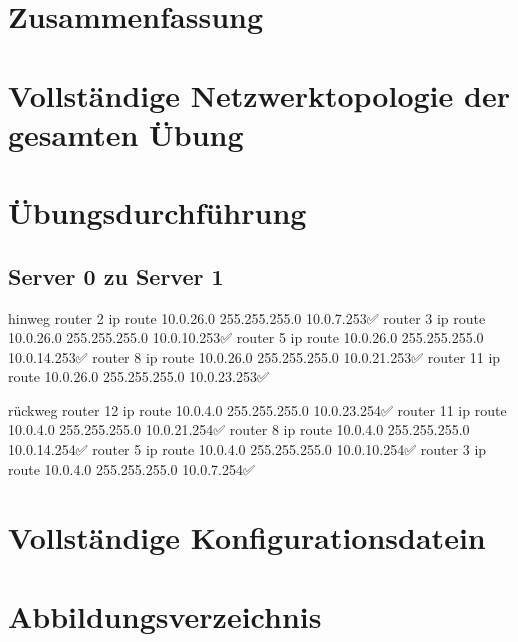 \documentclass[a4paper]{article}
\begin{document}
\section{Zusammenfassung}

\newpage

\section{Vollständige Netzwerktopologie der gesamten Übung}

\newpage

\section{Übungsdurchführung}

\subsection{Server 0 zu Server 1}

hinweg
router 2
ip route 10.0.26.0 255.255.255.0 10.0.7.253✅ 
router 3
ip route 10.0.26.0 255.255.255.0 10.0.10.253✅ 
router 5
ip route 10.0.26.0 255.255.255.0 10.0.14.253✅ 
router 8
ip route 10.0.26.0 255.255.255.0 10.0.21.253✅ 
router 11
ip route 10.0.26.0 255.255.255.0 10.0.23.253✅ 

rückweg
router 12
ip route 10.0.4.0 255.255.255.0 10.0.23.254✅ 
router 11
ip route 10.0.4.0 255.255.255.0 10.0.21.254✅ 
router 8
ip route 10.0.4.0 255.255.255.0 10.0.14.254✅ 
router 5
ip route 10.0.4.0 255.255.255.0 10.0.10.254✅ 
router 3
ip route 10.0.4.0 255.255.255.0 10.0.7.254✅ 

\newpage

\section{Vollständige Konfigurationsdatein}

\newpage

\section{Abbildungsverzeichnis}

\listoffigures
\end{document}
